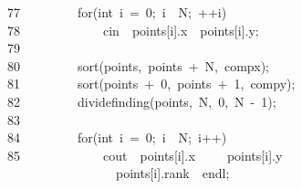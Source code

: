\documentclass{article}
\newcommand{\hlstd}[1]{\textcolor[rgb]{0.2,0.2,0.2}{#1}}
\newcommand{\hlnum}[1]{\textcolor[rgb]{0.06,0.58,0.63}{#1}}
\newcommand{\hlstr}[1]{\textcolor[rgb]{0.06,0.58,0.63}{#1}}
\newcommand{\hlopt}[1]{\textcolor[rgb]{0.2,0.2,0.2}{#1}}
\newcommand{\hllin}[1]{\textcolor[rgb]{0.59,0.59,0.59}{#1}}
\newcommand{\hlkwa}[1]{\textcolor[rgb]{0.23,0.42,0.78}{#1}}
\newcommand{\hlkwb}[1]{\textcolor[rgb]{0.63,0,0.31}{#1}}
\newcommand{\hlkwd}[1]{\textcolor[rgb]{0.78,0.23,0.41}{#1}}
\begin{document}
	\hllin{77\ }\hlstd{}\hlstd{\ \ \ \ \ \ \ \ }\hlstd{}\hlkwa{for}\hlstd{}\hlopt{(}\hlstd{}\hlkwb{int\ }\hlstd{i\ }\hlopt{=\ }\hlstd{}\hlnum{0}\hlstd{}\hlopt{;\ }\hlstd{i\ }\hlopt{\usebox{\hlboxlessthan}\ }\hlstd{N}\hlopt{;\ ++}\hlstd{i}\hlopt{)\usebox{\hlboxopenbrace}}\\
	\hllin{78\ }\hlstd{}\hlstd{\ \ \ \ \ \ \ \ \ \ \ \ }\hlstd{cin\ }\hlopt{\usebox{\hlboxgreaterthan}\usebox{\hlboxgreaterthan}\ }\hlstd{points}\hlopt{{[}}\hlstd{i}\hlopt{{]}.}\hlstd{x\ }\hlopt{\usebox{\hlboxgreaterthan}\usebox{\hlboxgreaterthan}\ }\hlstd{points}\hlopt{{[}}\hlstd{i}\hlopt{{]}.}\hlstd{y}\hlopt{;}\\
	\hllin{79\ }\hlstd{}\hlstd{\ \ \ \ \ \ \ \ }\hlstd{}\hlopt{\usebox{\hlboxclosebrace}}\\
	\hllin{80\ }\hlstd{}\hlstd{\ \ \ \ \ \ \ \ }\hlstd{}\hlkwd{sort}\hlstd{}\hlopt{(}\hlstd{points}\hlopt{,\ }\hlstd{points\ }\hlopt{+\ }\hlstd{N}\hlopt{,\ }\hlstd{comp\textunderscore x}\hlopt{);}\\
	\hllin{81\ }\hlstd{}\hlstd{\ \ \ \ \ \ \ \ }\hlstd{}\hlkwd{sort}\hlstd{}\hlopt{(}\hlstd{points\ }\hlopt{+\ }\hlstd{}\hlnum{0}\hlstd{}\hlopt{,\ }\hlstd{points\ }\hlopt{+\ }\hlstd{}\hlnum{1}\hlstd{}\hlopt{,\ }\hlstd{comp\textunderscore y}\hlopt{);}\\
	\hllin{82\ }\hlstd{}\hlstd{\ \ \ \ \ \ \ \ }\hlstd{}\hlkwd{divide\textunderscore finding}\hlstd{}\hlopt{(}\hlstd{points}\hlopt{,\ }\hlstd{N}\hlopt{,\ }\hlstd{}\hlnum{0}\hlstd{}\hlopt{,\ }\hlstd{N\ }\hlopt{{-}\ }\hlstd{}\hlnum{1}\hlstd{}\hlopt{);}\\
	\hllin{83\ }\hlstd{}\\
	\hllin{84\ }\hlstd{}\hlstd{\ \ \ \ \ \ \ \ }\hlstd{}\hlkwa{for}\hlstd{}\hlopt{(}\hlstd{}\hlkwb{int\ }\hlstd{i\ }\hlopt{=\ }\hlstd{}\hlnum{0}\hlstd{}\hlopt{;\ }\hlstd{i\ }\hlopt{\usebox{\hlboxlessthan}\ }\hlstd{N}\hlopt{;\ }\hlstd{i}\hlopt{++)\usebox{\hlboxopenbrace}}\\
	\hllin{85\ }\hlstd{}\hlstd{\ \ \ \ \ \ \ \ \ \ \ \ }\hlstd{cout\ }\hlopt{\usebox{\hlboxlessthan}\usebox{\hlboxlessthan}\ }\hlstd{points}\hlopt{{[}}\hlstd{i}\hlopt{{]}.}\hlstd{x\ }\hlopt{\usebox{\hlboxlessthan}\usebox{\hlboxlessthan}}\hlstd{}\hlstr{\dq{}\ \dq{}}\hlstd{\ }\hlopt{\usebox{\hlboxlessthan}\usebox{\hlboxlessthan}}\hlstd{\ \ }\hlopt{}\hlstd{points}\hlopt{{[}}\hlstd{i}\hlopt{{]}.}\hlstd{y}\hlstd{\ \ }\hlstd{}\hlopt{\usebox{\hlboxlessthan}\usebox{\hlboxlessthan}\ }\hlstd{}\hlstr{\dq{}\ }\\
	\hllin{\ \ \ }\hlstr{}\hlstd{\ \ \ \ \ \ \ \ \ \ \ \ }\hlstr{\dq{}}\hlstd{\ }\hlopt{\usebox{\hlboxlessthan}\usebox{\hlboxlessthan}\ }\hlstd{points}\hlopt{{[}}\hlstd{i}\hlopt{{]}.}\hlstd{rank\ }\hlopt{\usebox{\hlboxlessthan}\usebox{\hlboxlessthan}\ }\hlstd{endl}\hlopt{;}\\
\end{document}
